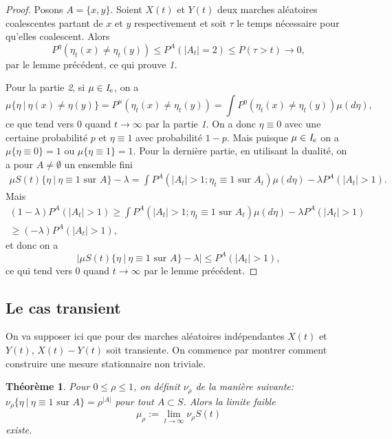\documentclass[a4paper,11pt]{article}
\theoremstyle{break}
\theoremstyle{break}
\newtheorem{theorem}{Théorème}[section]
\theoremstyle{definition}
\theoremstyle{remark}
\begin{document}
\begin{proof}
Posons $A=\{x,y\}$. Soient $X(t)$ et $Y(t)$ deux marches aléatoires coalescentes partant de $x$ et $y$ respectivement et soit $\tau$ le temps nécessaire pour qu'elles coalescent. Alors 
$$ 
P^\eta (\eta_t(x) \neq \eta_t(y))\leq P^A(\vert A_t \vert =2 )\leq P(\tau > t)\rightarrow 0,
$$
par le lemme précédent, ce qui prouve \textit{1.}

Pour la partie \textit{2}, si $\mu \in \emph{I}_e$, on  a
$$
\mu\{\eta \ \vert \ \eta (x) \neq \eta(y) \} = P^\mu (\eta_t (x) \neq \eta_t (y)) = \int P^\eta (\eta_t(x) \neq \eta_t (y))\mu (d\eta),
$$
ce que tend vers $0$ quand $t\rightarrow\infty$ par la partie \textit{1}. On a donc $\eta\equiv 0$ avec une certaine probabilité $p$ et $\eta\equiv 1$ avec probabilité $1-p$. Mais puisque $\mu \in \emph{I}_e$ on a  $\mu \{ \eta\equiv 0\} = 1$ ou $\mu \{ \eta\equiv 1\} = 1$.
Pour la dernière partie, en utilisant la dualité, on a pour $A\neq \emptyset$ un ensemble fini 
\begin{multline*}
\mu S(t) \{ \eta \ \vert \ \eta \equiv 1 \text{ sur }A\} -\lambda =\int P^A (\vert A_t\vert> 1 ;\eta_t \equiv 1 \text{ sur }A_t) \mu (d\eta) -\lambda P^A(\vert A_t\vert> 1).
\end{multline*}
Mais
\begin{multline*}
(1-\lambda)P^A(\vert A_t\vert >1)\geq\int P^A (\vert A_t\vert> 1 ;\eta_t \equiv 1 \text{ sur }A_t) \mu (d\eta) -\lambda P^A(\vert A_t\vert> 1) \\ 
\geq (-\lambda)P^A(\vert A_t\vert >1),
\end{multline*}
et donc on a
$$
\vert\mu S(t) \{\eta\ \vert \ \eta\equiv 1 \text{ sur } A \} - \lambda\vert \leq P^A(\vert A_t\vert >1),
$$
ce qui tend vers $0$ quand $t\rightarrow\infty$ par le lemme précédent.
\end{proof}

\subsection{Le cas transient}
On va supposer ici que pour des marches aléatoires indépendantes $X(t)$ et $Y(t)$, $X(t)-Y(t)$ soit transiente. On commence par montrer comment construire une mesure stationnaire non triviale. 

\begin{theorem}\label{murho}
Pour $0\leq\rho\leq 1$, on définit $\nu_\rho$ de 
la manière suivante: $\nu_\rho \{\eta\ \vert \ \eta\equiv 1 \text{ sur } A\}=\rho^{\vert A\vert}$ pour tout $A\subset S$. Alors la limite faible
$$
\mu_\rho:= \lim_{t\rightarrow\infty} \nu_\rho S(t)
$$
existe.
\end{theorem}
\end{document}
